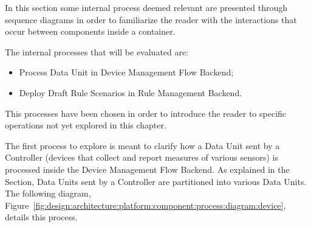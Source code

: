 In this section some internal process deemed relevant are presented through sequence diagrams in order to familiarize the reader with the interactions that occur between components inside a container.

The internal processes that will be evaluated are:

\begin{itemize}
   \item Process Data Unit in Device Management Flow Backend;
   \item Deploy Draft Rule Scenarios in Rule Management Backend.
\end{itemize}

This processes have been chosen in order to introduce the reader to specific operations not yet explored in this chapter.

The first process to explore is meant to clarify how a Data Unit sent by a Controller (devices that collect and report measures of various sensors) is processed inside the Device Management Flow Backend. As explained in the  Section, Data Units sent by a Controller are partitioned into various Data Units. The following diagram, Figure~\ref{fig:design:architecture:platform:component:process:diagram:device}, details this process.

